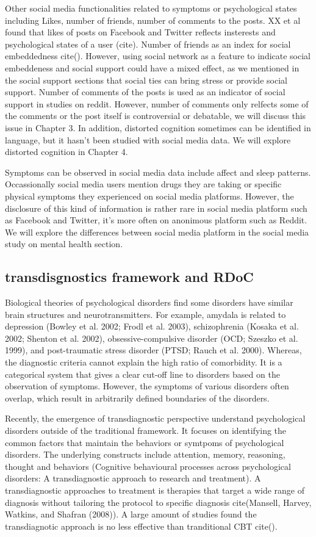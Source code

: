 Other social media functionalities related to symptoms or psychological states including Likes, number of friends, number of comments to the posts. XX et al found that likes of posts on Facebook and Twitter reflects insterests and psychological states of a user (cite). Number of friends as an index for social embeddedness cite(). However, using social network as a feature to indicate social embeddeness and social support could have a mixed effect, as we mentioned in the social support sections that social ties can bring stress or provide social support. Number of comments of the posts is used as an indicator of social support in studies on reddit. However, number of comments only relfects some of the comments or the post itself is controversial or debatable, we will discuss this issue in Chapter 3. In addition, distorted cognition sometimes can be identified in language, but it hasn't been studied with social media data. We will explore distorted cognition in Chapter 4. 

Symptoms can be observed in social media data include affect and sleep patterns. Occassionally social media users mention drugs they are taking or specific physical symptoms they experienced on social media platforms. However, the disclosure of this kind of information is rather rare in social media platform such as Facebook and Twitter, it's more often on anonimous platform such as Reddit. We will explore the differences between social media platform in the social media study on mental health section.


\subsection{transdisgnostics framework and RDoC}

Biological theories of psychological disorders find some disorders have similar brain structures and neurotransmitters. For example, amydala is related to depression (Bowley et al. 2002; Frodl et al. 2003), schizophrenia (Kosaka et al. 2002; Shenton et al. 2002), obsessive-compulsive disorder (OCD; Szeszko et al. 1999), and post-traumatic stress disorder (PTSD; Rauch et al. 2000). Whereas, the diagnostic criteria cannot explain the high ratio of comorbidity. It is a categorical system that gives a clear cut-off line to disorders based on the observation of symptoms. However, the symptoms of various disorders often overlap, which result in arbitrarily defined boundaries of the disorders. 

Recently, the emergence of transdiagnostic perspective understand psychological disorders outside of the traditional framework. It focuses on identifying the common factors that maintain the behaviors or symtpoms of psychological disorders. The underlying constructs include attention, memory, reasoning, thought and behaviors (Cognitive behavioural processes across psychological disorders: A transdiagnostic approach to research and treatment). A transdiagnostic approaches to treatment is therapies that target a wide range of diagnosis without tailoring the protocol to specific diagnosis cite(Mansell, Harvey, Watkins, and Shafran (2008)). A large amount of studies found the transdiagnotic approach is no less effective than tranditional CBT cite().

